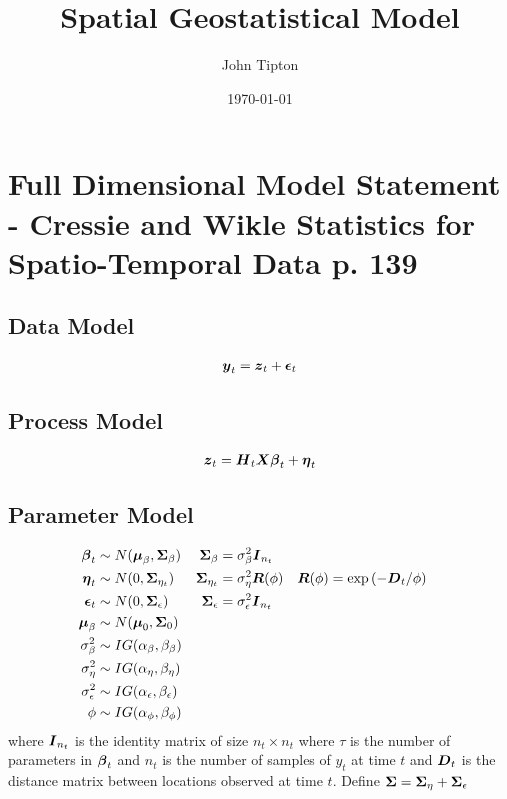 \documentclass[fleqn]{article}
\title{Spatial Geostatistical Model}
\author{John Tipton}
\date{\today}
\def\bm#1{\mbox{\boldmath $#1$}}
\begin{document}
\maketitle

\section{Full Dimensional Model Statement - Cressie and Wikle Statistics for Spatio-Temporal Data p. 139}
%
\subsection{Data Model}
\begin{align*}
%
\bm{y}_t & = \bm{z}_t + \bm{\epsilon}_t\\
%
\end{align*}
%
\subsection{Process Model}
%
\begin{align*}
%
\bm{z}_t & = \bm{H}_t \bm{X} \bm{\beta}_t + \bm{\eta}_t\\
%
\end{align*}
%
\subsection{Parameter Model}
%
\begin{align*}
%
\bm{\beta}_t & \sim N(\bm{\mu}_\beta, \bm{\Sigma}_\beta) & \bm{\Sigma}_\beta &  = \sigma^2_\beta \bm{I}_{n_t}\\
%
\bm{\eta}_t & \sim N(0, \bm{\Sigma}_{\eta_t}) & \bm{\Sigma}_{\eta_t} &  = \sigma^2_\eta \bm{R}(\phi) & \bm{R}(\phi) & = \exp{ \left( - \bm{D}_t / \phi \right)}\\
%
\bm{\epsilon}_t & \sim N(0, \bm{\Sigma}_\epsilon) & \bm{\Sigma}_\epsilon &  = \sigma^2_\epsilon \bm{I}_{n_t}\\
%
\bm{\mu}_\beta & \sim N(\bm{\mu}_0, \bm{\Sigma}_0)\\
%
\sigma^2_\beta & \sim IG(\alpha_\beta, \beta_\beta)\\
%
\sigma^2_\eta & \sim IG(\alpha_\eta, \beta_\eta)\\
%
\sigma^2_\epsilon & \sim IG(\alpha_\epsilon, \beta_\epsilon)\\
%
\phi & \sim IG(\alpha_\phi, \beta_\phi)
\end{align*}
%
where $\bm{I}_{n_t}$ is the identity matrix of size $n_t \times n_t$ where $\tau$ is the number of parameters in $\bm{\beta}_t$ and $n_t$ is the number of samples of $y_t$ at time $t$ and $\bm{D}_t$ is the distance matrix between locations observed at time $t$. Define $\bm{\Sigma} = \bm{\Sigma}_\eta + \bm{\Sigma}_\epsilon$
%
\end{document}
